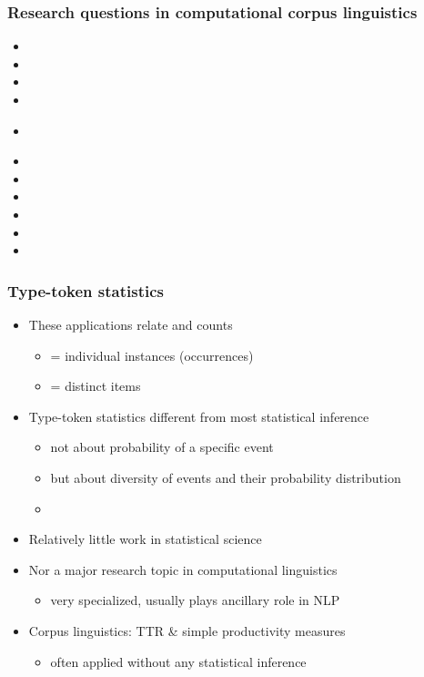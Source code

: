 \documentclass[t]{beamer} %
\begin{document}
\begin{frame}
  \frametitle{Research questions in computational corpus linguistics}

  \begin{itemize}
  \item 
  \item {}
  \item
  \item
  \item {}\\\rule{0mm}{1ex}
  \item {}
  \item 
  \item {}
  \item 
  \item {}
  \item 
  \end{itemize}
\end{frame}

\begin{frame}
  \frametitle{Type-token statistics}

  \begin{itemize}
  \item These applications relate  and  counts
    \begin{itemize}
    \item {} = individual instances (occurrences)
    \item {} = distinct items
    \end{itemize}
  \item Type-token statistics different from most statistical inference
    \begin{itemize}
    \item not about probability of a specific event
    \item but about diversity of events and their probability distribution
    \item[]\pause
    \end{itemize}
  \item Relatively little work in statistical science
  \item Nor a major research topic in computational linguistics
    \begin{itemize}
    \item very specialized, usually plays ancillary role in NLP
    \end{itemize}
  \item Corpus linguistics: TTR \& simple productivity measures
    \begin{itemize}
    \item often applied without any statistical inference
    \end{itemize}
  \end{itemize}
\end{frame}
\end{document}
